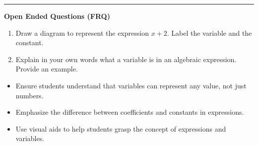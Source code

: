 \documentclass[10pt]{article}
\begin{document}
\vspace{-0.2cm}
\hrule
\vspace{0.2cm}
\textbf{\small Open Ended Questions (FRQ)}
\begin{enumerate}[label=\textbf{Q\arabic*.}, start=9, itemsep=5pt, topsep=0pt]

  \item \small Draw a diagram to represent the expression $x + 2$. Label the variable and the constant. \vspace{2cm}

  \item \small Explain in your own words what a variable is in an algebraic expression. Provide an example. \vspace{2cm}

\end{enumerate}

\vfill

\begin{tcolorbox}[colback=blue!5, colframe=mainblue!50, title=\small \textbf{Chef's Tips}, fonttitle=\bfseries, bottom=1mm]
\begin{itemize}[noitemsep, topsep=2pt, leftmargin=0.5cm]
  \item \scriptsize Ensure students understand that variables can represent any value, not just numbers.\item \scriptsize Emphasize the difference between coefficients and constants in expressions.\item \scriptsize Use visual aids to help students grasp the concept of expressions and variables.
\end{itemize}
\end{tcolorbox}
\end{document}
